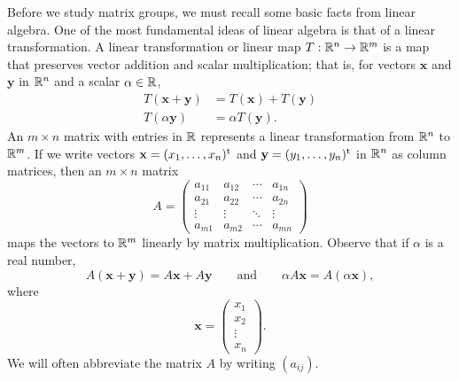 Before we study matrix groups, we must recall some basic facts from
linear algebra.  One of the most fundamental ideas of linear algebra
is that of a linear transformation. A {\bfi linear
transformation\/} or {\bfi 
linear map} $T : {\Bbb R}^n \rightarrow {\Bbb R}^m$
is a map that preserves vector addition and scalar multiplication;
that is, for vectors ${\mathbf x}$ and ${\mathbf y}$ in ${\Bbb R}^n$ and a
scalar $\alpha \in {\Bbb R}$, 
\begin{align*}
T({\mathbf x}+{\mathbf y}) & = T({\mathbf x}) + T({\mathbf y}) \\
T(\alpha {\mathbf y}) & = \alpha T({\mathbf y}).
\end{align*}
An $m \times n$ matrix with entries in ${\Bbb R}$ represents a linear
transformation from ${\Bbb R}^n$ to ${\Bbb R}^m$. If we write vectors
${\mathbf x} = (x_1, \ldots, x_n)^{\rm t}$ and ${\mathbf y} = (y_1,
\ldots, y_n)^{\rm t}$ in ${\Bbb R}^n$ as column matrices, then an $m
\times n$ matrix 
\[
A
=
\begin{pmatrix}
a_{11} & a_{12} & \cdots & a_{1n} \\
a_{21} & a_{22} & \cdots & a_{2n} \\
\vdots & \vdots & \ddots & \vdots \\
a_{m1} & a_{m2} & \cdots & a_{mn}
\end{pmatrix}
\]
maps the vectors to ${\Bbb R}^m$ linearly by matrix
multiplication.  Observe that if $\alpha$ is a real number,
\[
A({\mathbf x} + {\mathbf y} ) 
 = 
A {\mathbf x }+ A {\mathbf y} 
\qquad \text{and} \qquad
\alpha A {\mathbf x} 
 = 
A ( \alpha {\mathbf x}),
\]
where
\[
{\mathbf x}
=
\begin{pmatrix}
x_1 \\
x_2 \\
\vdots \\
x_n
\end{pmatrix}.
\]
We will often abbreviate the matrix $A$ by writing
$(a_{ij})$\label{matrixnote}.  
 

